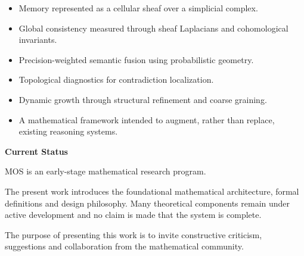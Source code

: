 \begin{center}
\begin{tcolorbox}[%
  colback=MOSDarkRed,
  colframe=MOSGold,
  title=\Large\bfseries Key Contributions,
  coltitle=MOSGold
]
\BodyFont

\begin{itemize}

\item Memory represented as a cellular sheaf over a simplicial complex.

\item Global consistency measured through sheaf Laplacians and
cohomological invariants.

\item Precision-weighted semantic fusion using probabilistic geometry.

\item Topological diagnostics for contradiction localization.

\item Dynamic growth through structural refinement and coarse graining.

\item A mathematical framework intended to augment, rather than replace,
existing reasoning systems.

\end{itemize}

\end{tcolorbox}

\vspace{8mm}


\begin{remarkbox}

\BodyFont

\textbf{Current Status}

MOS is an early-stage mathematical research program.

The present work introduces the foundational mathematical architecture,
formal definitions and design philosophy.
Many theoretical components remain under active development and no claim
is made that the system is complete.

The purpose of presenting this work is to invite constructive criticism,
suggestions and collaboration from the mathematical community.

\end{remarkbox}

\end{center}

